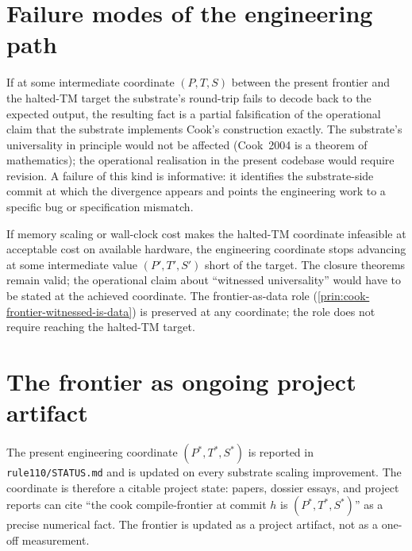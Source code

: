 \section{Failure modes of the engineering path}
\label{sec:cook-frontier-failure-modes}

\begin{remark}
\label{rem:cook-frontier-substrate-divergence}
If at some intermediate coordinate $(P, T, S)$ between the present frontier and the halted-TM target the substrate's round-trip fails to decode back to the expected output, the resulting fact is a partial falsification of the operational claim that the substrate implements Cook's construction exactly. The substrate's universality in principle would not be affected (Cook~2004 is a theorem of mathematics); the operational realisation in the present codebase would require revision. A failure of this kind is informative: it identifies the substrate-side commit at which the divergence appears and points the engineering work to a specific bug or specification mismatch.
\end{remark}

\begin{remark}
\label{rem:cook-frontier-infeasibility}
If memory scaling or wall-clock cost makes the halted-TM coordinate infeasible at acceptable cost on available hardware, the engineering coordinate stops advancing at some intermediate value $(P', T', S')$ short of the target. The closure theorems remain valid; the operational claim about ``witnessed universality'' would have to be stated at the achieved coordinate. The frontier-as-data role (\autoref{prin:cook-frontier-witnessed-is-data}) is preserved at any coordinate; the role does not require reaching the halted-TM target.
\end{remark}

\section{The frontier as ongoing project artifact}
\label{sec:cook-frontier-as-ongoing-artifact}

\begin{principle}
\label{prin:cook-frontier-citable-state}
The present engineering coordinate $(P^*, T^*, S^*)$ is reported in \texttt{rule110/STATUS.md} and is updated on every substrate scaling improvement. The coordinate is therefore a citable project state: papers, dossier essays, and project reports can cite ``the cook compile-frontier at commit $h$ is $(P^*, T^*, S^*)$'' as a precise numerical fact. The frontier is updated as a project artifact, not as a one-off measurement.
\end{principle}

